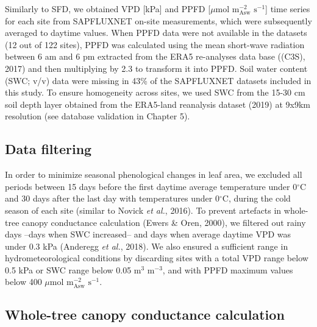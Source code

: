 \documentclass[11pt,twoside]{reedthesis}
\begin{document}
Similarly to SFD, we obtained VPD {[}kPa{]} and PPFD {[}\(\mu\)mol
\(\text{m}^{-2}_{\text{Asw}}\) \(\text{s}^{-1}\){]} time series for each
site from SAPFLUXNET on-site measurements, which were subsequently
averaged to daytime values. When PPFD data were not available in the
datasets (12 out of 122 sites), PPFD was calculated using the mean
short-wave radiation between 6 am and 6 pm extracted from the ERA5
re-analyses data base ((C3S), 2017) and then multiplying by 2.3 to
transform it into PPFD. Soil water content (SWC; v/v) data were missing
in 43\% of the SAPFLUXNET datasets included in this study. To ensure
homogeneity across sites, we used SWC from the 15-30 cm soil depth layer
obtained from the ERA5-land reanalysis dataset (2019) at 9x9km
resolution (see database validation in Chapter 5).\par

\vspace*{\fill}

\subsection{Data filtering}\label{data-filtering}

In order to minimize seasonal phenological changes in leaf area, we
excluded all periods between 15 days before the first daytime average
temperature under 0\(^{\circ}\)C and 30 days after the last day with
temperatures under 0\(^{\circ}\)C, during the cold season of each site
(similar to Novick \emph{et al.}, 2016). To prevent artefacts in
whole-tree canopy conductance calculation (Ewers \& Oren, 2000), we
filtered out rainy days --days when SWC increased-- and days when
average daytime VPD was under 0.3 kPa (Anderegg \emph{et al.}, 2018). We
also ensured a sufficient range in hydrometeorological conditions by
discarding sites with a total VPD range below 0.5 kPa or SWC range below
0.05 \(\text{m}^{3}\) \(\text{m}^{-3}\), and with PPFD maximum values
below 400 \(\mu\)mol \(\text{m}^{-2}_{\text{Asw}}\)
\(\text{s}^{-1}\).\par

\subsection{Whole-tree canopy conductance
calculation}\label{whole-tree-canopy-conductance-calculation}
\end{document}
